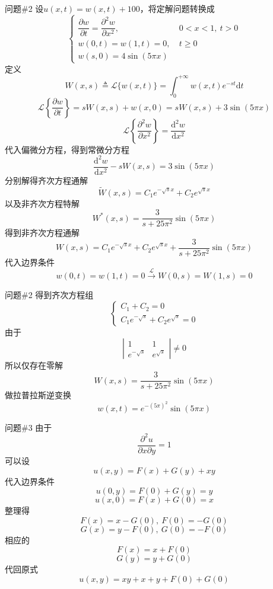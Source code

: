 \documentclass[12pt]{ctexart}
\begin{document}
    \begin{problem}{问题\#2}
        设$u(x,t)=w(x,t)+100$，将定解问题转换成
        $$
        \begin{cases}
            \dfrac{\partial w}{\partial t}=\dfrac{\partial^2w}{\partial  x^2},&\ 0<x<1,\ t>0\\
            w(0,t)=w(1,t)=0,&\ t\geqslant0\\
            w(s,0)=4\sin(5\pi x)
        \end{cases}
        $$
        定义
        $$
        W(x,s)\triangleq\mathscr{L}\{w(x,t)\}=\int^{+\infty}_0w(x,t)e^{-st}\mathrm{d}t
        $$
        $$
        \mathscr{L}\left\{\dfrac{\partial w}{\partial t}\right\}=sW(x,s)+w(x,0)=sW(x,s)+3\sin(5\pi x)
        $$
        $$
        \mathscr{L}\left\{\dfrac{\partial^2w}{\partial x^2}\right\}=\dfrac{\mathrm{d}^2w}{\mathrm{d}x^2}
        $$
        代入偏微分方程，得到常微分方程
        $$
        \dfrac{\mathrm{d}^2w}{\mathrm{d}x^2}-sW(x,s)=3\sin(5\pi x)
        $$
        分别解得齐次方程通解
        $$
        \widetilde{W}(x,s)=C_1e^{-\sqrt{s}x}+C_2e^{\sqrt{s}x}
        $$
        以及非齐次方程特解
        $$
        W^\ast(x,s)=\dfrac{3}{s+25\pi^2}\sin(5\pi x)
        $$
        得到非齐次方程通解
        $$
        W(x,s)=C_1e^{-\sqrt{s}x}+C_2e^{\sqrt{s}x}+\dfrac{3}{s+25\pi^2}\sin(5\pi x)
        $$
        代入边界条件
        $$
        w(0,t)=w(1,t)=0\stackrel{\mathscr{L}}{\longrightarrow}W(0,s)=W(1,s)=0
        $$
    \end{problem}
    \begin{problem}{问题\#2}
        得到齐次方程组
        $$
        \begin{cases}
            C_1+C_2=0\\
            C_1e^{-\sqrt{s}}+C_2e^{\sqrt{s}}=0
        \end{cases}
        $$
        由于
        $$
        \left|
            \begin{array}{cc}
                1 & 1\\
                e^{-\sqrt{s}} & e^{\sqrt{s}}
            \end{array}
        \right|\neq0 
        $$
        所以仅存在零解
        $$
        W(x,s)=\dfrac{3}{s+25\pi^2}\sin(5\pi x)
        $$
        做拉普拉斯逆变换
        $$
        w(x,t)=e^{-(5\pi)^2}\sin(5\pi x)
        $$
    \end{problem}
    \begin{problem}{问题\#3}
        由于
        $$
        \dfrac{\partial^2u}{\partial x\partial y}=1
        $$
        可以设
        $$
        u(x,y)=F(x)+G(y)+xy
        $$
        代入边界条件
        $$
        u(0,y)=F(0)+G(y)=y
        $$
        $$
        u(x,0)=F(x)+G(0)=x
        $$
        整理得
        $$
        F(x)=x-G(0),\ F(0)=-G(0)
        $$
        $$
        G(x)=y-F(0),\ G(0)=-F(0)
        $$
        相应的
        $$
        F(x)=x+F(0)
        $$
        $$
        G(y)=y+G(0)
        $$
        代回原式
        $$
        u(x,y)=xy+x+y+F(0)+G(0)
        $$
    \end{problem}
\end{document}

